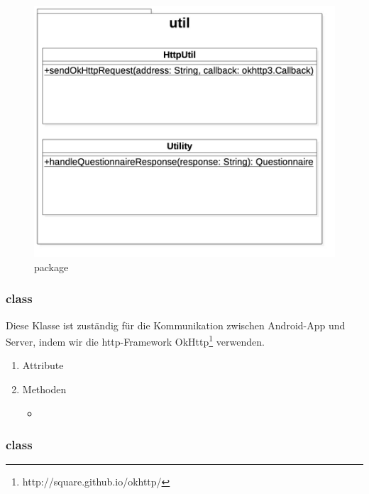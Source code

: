 \documentclass[a4paper]{scrreprt}
\begin{document}
                \vspace*{3cm}
                \begin{figure}[H]
                    \centering
                    \includegraphics[scale = 0.5]{util.jpg}
                    \caption{package }
                \end{figure}

                \subsubsection{class }

                    Diese Klasse ist zuständig für die Kommunikation zwischen Android-App und Server, indem wir die http-Framework OkHttp\footnote{http://square.github.io/okhttp/} verwenden.

                    \begin{enumerate}
                        \item Attribute
                        \item Methoden
                            \begin{itemize}
                                \item {}
                            \end{itemize}
                    \end{enumerate}

                \subsubsection{class }
\end{document}
